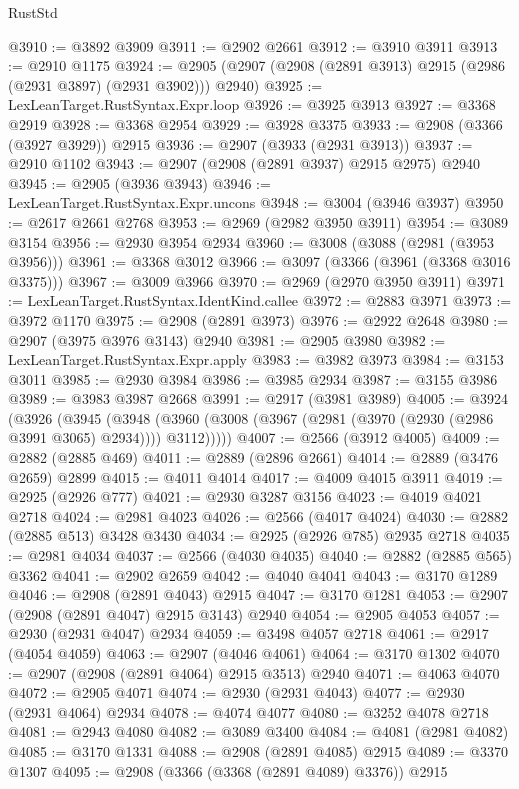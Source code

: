 \begin{lexlean}{RustStd}
\begin{coremodule}
@3910 := @3892 @3909
@3911 := @2902 @2661
@3912 := @3910 @3911
@3913 := @2910 @1175
@3924 := @2905 (@2907 (@2908 (@2891 @3913) @2915 (@2986 (@2931 @3897) (@2931 @3902))) @2940)
@3925 := LexLeanTarget.RustSyntax.Expr.loop
@3926 := @3925 @3913
@3927 := @3368 @2919
@3928 := @3368 @2954
@3929 := @3928 @3375
@3933 := @2908 (@3366 (@3927 @3929)) @2915
@3936 := @2907 (@3933 (@2931 @3913))
@3937 := @2910 @1102
@3943 := @2907 (@2908 (@2891 @3937) @2915 @2975) @2940
@3945 := @2905 (@3936 @3943)
@3946 := LexLeanTarget.RustSyntax.Expr.uncons
@3948 := @3004 (@3946 @3937)
@3950 := @2617 @2661 @2768
@3953 := @2969 (@2982 @3950 @3911)
@3954 := @3089 @3154
@3956 := @2930 @3954 @2934
@3960 := @3008 (@3088 (@2981 (@3953 @3956)))
@3961 := @3368 @3012
@3966 := @3097 (@3366 (@3961 (@3368 @3016 @3375)))
@3967 := @3009 @3966
@3970 := @2969 (@2970 @3950 @3911)
@3971 := LexLeanTarget.RustSyntax.IdentKind.callee
@3972 := @2883 @3971
@3973 := @3972 @1170
@3975 := @2908 (@2891 @3973)
@3976 := @2922 @2648
@3980 := @2907 (@3975 @3976 @3143) @2940
@3981 := @2905 @3980
@3982 := LexLeanTarget.RustSyntax.Expr.apply
@3983 := @3982 @3973
@3984 := @3153 @3011
@3985 := @2930 @3984
@3986 := @3985 @2934
@3987 := @3155 @3986
@3989 := @3983 @3987 @2668
@3991 := @2917 (@3981 @3989)
@4005 := @3924
    (@3926
      (@3945
        (@3948 (@3960 (@3008 (@3967 (@2981 (@3970 (@2930 (@2986 @3991 @3065) @2934)))) @3112)))))
@4007 := @2566 (@3912 @4005)
@4009 := @2882 (@2885 @469)
@4011 := @2889 (@2896 @2661)
@4014 := @2889 (@3476 @2659) @2899
@4015 := @4011 @4014
@4017 := @4009 @4015 @3911
@4019 := @2925 (@2926 @777)
@4021 := @2930 @3287 @3156
@4023 := @4019 @4021 @2718
@4024 := @2981 @4023
@4026 := @2566 (@4017 @4024)
@4030 := @2882 (@2885 @513) @3428 @3430
@4034 := @2925 (@2926 @785) @2935 @2718
@4035 := @2981 @4034
@4037 := @2566 (@4030 @4035)
@4040 := @2882 (@2885 @565) @3362
@4041 := @2902 @2659
@4042 := @4040 @4041
@4043 := @3170 @1289
@4046 := @2908 (@2891 @4043) @2915
@4047 := @3170 @1281
@4053 := @2907 (@2908 (@2891 @4047) @2915 @3143) @2940
@4054 := @2905 @4053
@4057 := @2930 (@2931 @4047) @2934
@4059 := @3498 @4057 @2718
@4061 := @2917 (@4054 @4059)
@4063 := @2907 (@4046 @4061)
@4064 := @3170 @1302
@4070 := @2907 (@2908 (@2891 @4064) @2915 @3513) @2940
@4071 := @4063 @4070
@4072 := @2905 @4071
@4074 := @2930 (@2931 @4043)
@4077 := @2930 (@2931 @4064) @2934
@4078 := @4074 @4077
@4080 := @3252 @4078 @2718
@4081 := @2943 @4080
@4082 := @3089 @3400
@4084 := @4081 (@2981 @4082)
@4085 := @3170 @1331
@4088 := @2908 (@2891 @4085) @2915
@4089 := @3370 @1307
@4095 := @2908 (@3366 (@3368 (@2891 @4089) @3376)) @2915

\end{coremodule}
\end{lexlean}
